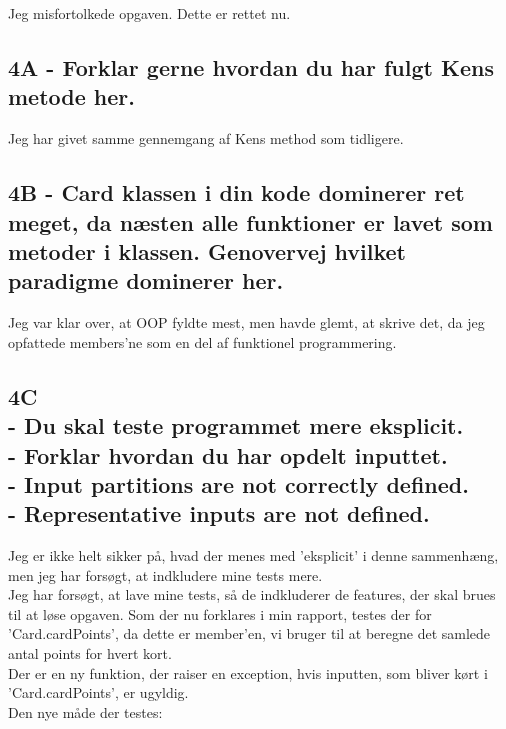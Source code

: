 \documentclass[a4paper,12pt]{article}
\begin{document}
Jeg misfortolkede opgaven. Dette er rettet nu.

\subsection*{4A - Forklar gerne hvordan du har fulgt Kens metode her.}

Jeg har givet samme gennemgang af Kens method som tidligere.

\subsection*{4B - Card klassen i din kode dominerer ret meget, da næsten alle funktioner er lavet som metoder i klassen.
Genovervej hvilket paradigme dominerer her.}
Jeg var klar over, at OOP fyldte mest, men havde glemt, at skrive det, da jeg opfattede members'ne som en del af funktionel programmering.


\subsection*{4C\\
- Du skal teste programmet mere eksplicit.\\
- Forklar hvordan du har opdelt inputtet.\\
- Input partitions are not correctly defined.\\
- Representative inputs are not defined.}

Jeg er ikke helt sikker på, hvad der menes med 'eksplicit' i denne sammenhæng, men jeg har forsøgt, at indkludere mine tests mere.\\
Jeg har forsøgt, at lave mine tests, så de indkluderer de features, der skal brues til at løse opgaven. Som der nu forklares i min rapport, testes der for 'Card.cardPoints', da dette er member'en, vi bruger til at beregne det samlede antal points for hvert kort.\\
Der er en ny funktion, der raiser en exception, hvis inputten, som bliver kørt i 'Card.cardPoints', er ugyldig.\\
Den nye måde der testes:
\end{document}
